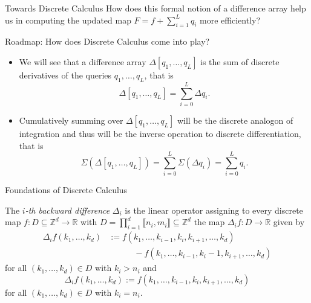 \documentclass[
    t,10pt,
    handout
]{beamer}
\begin{document}
\begin{frame}{Towards Discrete Calculus}
    How does this formal notion of a difference array help us in computing the updated map \( F = f + \sum_{i=1}^L q_i \) more efficiently? 

    \vspace{.2cm}

\end{frame}

\begin{frame}{Roadmap: How does Discrete Calculus come into play?}
    \begin{itemize}[<+->]
	\item We will see that a difference array \( \Delta[q_1,\dots,q_L] \) is the sum of discrete derivatives of the queries \( q_1, \dots, q_L \), that is 
	    \begin{equation*}
		\Delta[q_1,\dots,q_L] = \sum_{i=0}^L \Delta q_i. 
	    \end{equation*}
	\item Cumulatively summing over \( \Delta[q_1,\dots,q_L] \) will be the discrete analogon of integration and thus will be the inverse operation to discrete differentiation, that is 
	    \begin{equation*}
		\Sigma(\Delta[q_1,\dots,q_L]) = \sum_{i=0}^L \Sigma(\Delta q_i) = \sum_{i=0}^L q_i. 
	    \end{equation*}
    \end{itemize}
\end{frame}

\begin{frame}{Foundations of Discrete Calculus}
    \begin{definition*}{}
	The \emph{\( i \)-th backward difference} \( \Delta_i \) is the linear operator assigning to every discrete map \( f : D \subseteq \mathbb Z^d \to \mathbb R \) with \( D = \prod_{i=1}^d \llbracket n_i, m_i \rrbracket \subseteq \mathbb Z^d \) the map \( \Delta_i f: D \to \mathbb R \) given by 
	\begin{align*}
	    \Delta_i f(k_1, \dots, k_d) &:= f(k_1, \dots, k_{i-1}, k_i, k_{i+1}, \dots, k_d) \\
					& \quad\qquad - f(k_1, \dots, k_{i-1}, k_i-1, k_{i+1}, \dots, k_d)
	\end{align*}
	for all \( (k_1,\dots,k_d) \in D \) with \( k_i > n_i \) and 
	\begin{equation*}
	    \Delta_i f(k_1, \dots, k_d) := f(k_1, \dots, k_{i-1},k_i,k_{i+1}, \dots, k_d)
	\end{equation*}
	for all \( (k_1,\dots,k_d) \in D \) with \( k_i = n_i \). 
    \end{definition*}
\end{frame}
\end{document}
